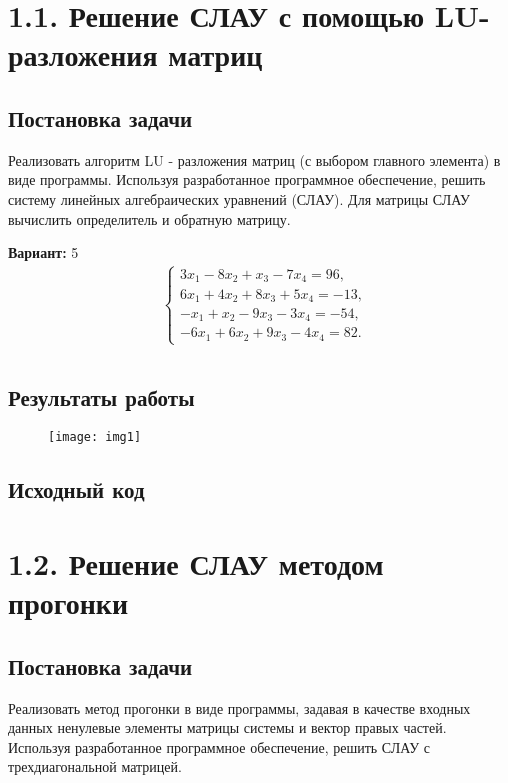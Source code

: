 \section* {1.1. Решение СЛАУ с помощью LU-разложения матриц}


\subsection{Постановка задачи}
Реализовать алгоритм LU -  разложения матриц (с выбором главного элемента) в виде программы. Используя разработанное программное обеспечение, решить систему линейных алгебраических уравнений (СЛАУ). Для матрицы СЛАУ вычислить определитель и обратную матрицу. 

{\bfseries Вариант:} 5
\begin{align*}
& \begin{cases}
3x_1 - 8x_2 + x_3 - 7x_4 = 96,\\
6x_1 + 4x_2 + 8x_3 + 5x_4 = -13,\\
-x_1 + x_2 - 9x_3 - 3x_4 = -54,\\
-6x_1 + 6x_2 + 9x_3 - 4x_4 = 82.
\end{cases} \\
\end{align*}

\subsection{Результаты работы}
\begin{figure}[h!]
\raggedright
\texttt{[image: img1]}
\end{figure}
\pagebreak

\subsection{Исходный код}

\pagebreak

\section* {1.2. Решение СЛАУ методом прогонки}

\setcounter{subsection}{0}

\subsection{Постановка задачи}
Реализовать метод прогонки в виде программы, задавая в качестве входных данных ненулевые элементы матрицы системы и вектор правых частей. Используя разработанное программное обеспечение, решить СЛАУ с трехдиагональной матрицей.    

